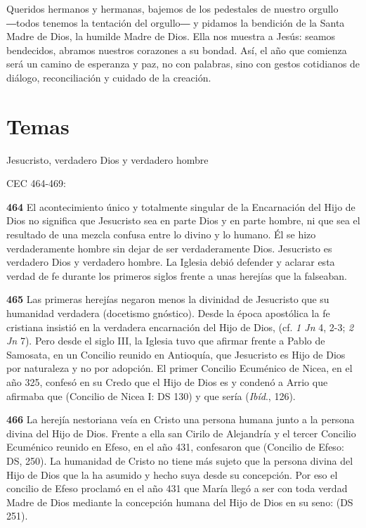 \begin{body}
\begin{body}
Queridos hermanos y hermanas, bajemos de los pedestales de nuestro orgullo ―todos tenemos la tentación del orgullo― y pidamos la bendición de la Santa Madre de Dios, la humilde Madre de Dios. Ella nos muestra a Jesús: seamos bendecidos, abramos nuestros corazones a su bondad. Así, el año que comienza será un camino de esperanza y paz, no con palabras, sino con gestos cotidianos de diálogo, reconciliación y cuidado de la creación.


\section{Temas}

Jesucristo, verdadero Dios y verdadero hombre

CEC 464-469:

\textbf{464} El acontecimiento único y totalmente singular de la Encarnación del Hijo de Dios no significa que Jesucristo sea en parte Dios y en parte hombre, ni que sea el resultado de una mezcla confusa entre lo divino y lo humano. Él se hizo verdaderamente hombre sin dejar de ser verdaderamente Dios. Jesucristo es verdadero Dios y verdadero hombre. La Iglesia debió defender y aclarar esta verdad de fe durante los primeros siglos frente a unas herejías que la falseaban.

\textbf{465} Las primeras herejías negaron menos la divinidad de Jesucristo que su humanidad verdadera (docetismo gnóstico). Desde la época apostólica la fe cristiana insistió en la verdadera encarnación del Hijo de Dios,  (cf. \emph{1 Jn} 4, 2-3; \emph{2 Jn} 7). Pero desde el siglo III, la Iglesia tuvo que afirmar frente a Pablo de Samosata, en un Concilio reunido en Antioquía, que Jesucristo es Hijo de Dios por naturaleza y no por adopción. El primer Concilio Ecuménico de Nicea, en el año 325, confesó en su Credo que el Hijo de Dios es  y condenó a Arrio que afirmaba que  (Concilio de Nicea I: DS 130) y que sería  (\emph{Ibíd}., 126).

\textbf{466} La herejía nestoriana veía en Cristo una persona humana junto a la persona divina del Hijo de Dios. Frente a ella san Cirilo de Alejandría y el tercer Concilio Ecuménico reunido en Efeso, en el año 431, confesaron que  (Concilio de Efeso: DS, 250). La humanidad de Cristo no tiene más sujeto que la persona divina del Hijo de Dios que la ha asumido y hecho suya desde su concepción. Por eso el concilio de Efeso proclamó en el año 431 que María llegó a ser con toda verdad Madre de Dios mediante la concepción humana del Hijo de Dios en su seno:  (DS 251).


\end{body}
\end{body}
